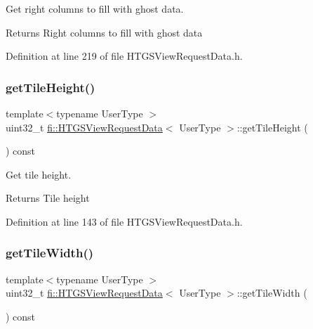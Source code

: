 Get right columns to fill with ghost data. 

\begin{DoxyReturn}{Returns}
Right columns to fill with ghost data 
\end{DoxyReturn}


Definition at line 219 of file H\+T\+G\+S\+View\+Request\+Data.\+h.

\mbox{\label{classfi_1_1HTGSViewRequestData_a0aca45f093605e99b90e4bec039c96e4}} 
\subsubsection{\texorpdfstring{get\+Tile\+Height()}{getTileHeight()}}
{\footnotesize\ttfamily template$<$typename User\+Type $>$ \\
uint32\+\_\+t \hyperlink{classfi_1_1HTGSViewRequestData}{fi\+::\+H\+T\+G\+S\+View\+Request\+Data}$<$ User\+Type $>$\+::get\+Tile\+Height (\begin{DoxyParamCaption}{ }\end{DoxyParamCaption}) const\hspace{0.3cm}{\ttfamily [inline]}}



Get tile height. 

\begin{DoxyReturn}{Returns}
Tile height 
\end{DoxyReturn}


Definition at line 143 of file H\+T\+G\+S\+View\+Request\+Data.\+h.

\mbox{\label{classfi_1_1HTGSViewRequestData_a8a2cd5e4376c82ade927177dc6446b01}} 
\subsubsection{\texorpdfstring{get\+Tile\+Width()}{getTileWidth()}}
{\footnotesize\ttfamily template$<$typename User\+Type $>$ \\
uint32\+\_\+t \hyperlink{classfi_1_1HTGSViewRequestData}{fi\+::\+H\+T\+G\+S\+View\+Request\+Data}$<$ User\+Type $>$\+::get\+Tile\+Width (\begin{DoxyParamCaption}{ }\end{DoxyParamCaption}) const\hspace{0.3cm}{\ttfamily [inline]}}



